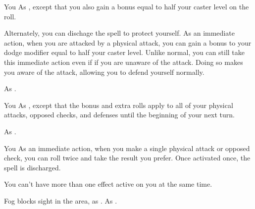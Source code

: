 \begin{spelltarget}{You}
    \spelleffect As , except that you also gain a bonus equal to half your caster level on the roll.

    Alternately, you can dischage the spell to protect yourself. As an immediate action, when you are attacked by a physical attack, you can gain a bonus to your dodge modifier equal to half your caster level. Unlike normal, you can still take this immediate action even if if you are unaware of the attack. Doing so makes you aware of the attack, allowing you to defend yourself normally.
\end{spelltarget}
\spellnotes As .

\begin{spelltarget}{You}
    \spelleffect As , except that the bonus and extra rolls apply to all of your physical attacks, opposed checks, and defenses until the beginning of your next turn.
\end{spelltarget}
\spellnotes As .

\begin{spelltarget}{You}
    \spelleffect As an immediate action, when you make a single physical attack or opposed check, you can roll twice and take the result you prefer. Once activated once, the spell is discharged.
\end{spelltarget}
\spellnotes You can't have more than one  effect active on you at the same time.

\begin{comment}
\subsubsection{O-P}
\end{comment}

\spelldur{\durshort}
\spellline
\spelleffect Fog blocks sight in the area, as .
\spellnotes As .

